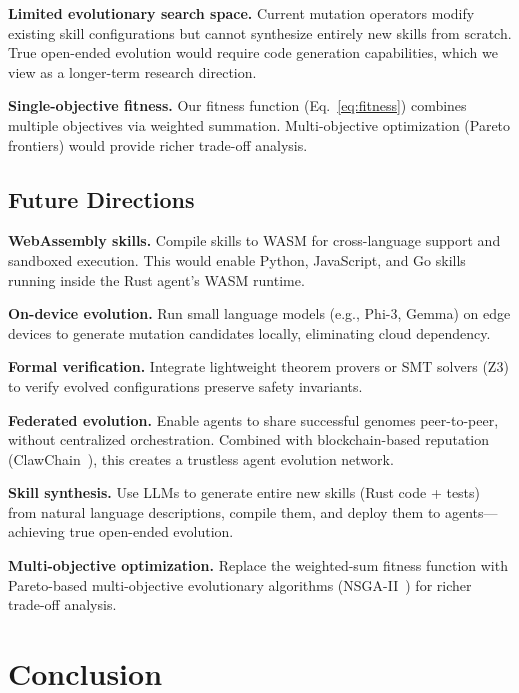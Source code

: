\documentclass{article}
\begin{document}
\textbf{Limited evolutionary search space.} Current mutation operators modify existing skill configurations but cannot synthesize entirely new skills from scratch. True open-ended evolution would require code generation capabilities, which we view as a longer-term research direction.

\textbf{Single-objective fitness.} Our fitness function (Eq.~\ref{eq:fitness}) combines multiple objectives via weighted summation. Multi-objective optimization (Pareto frontiers) would provide richer trade-off analysis.


\subsection{Future Directions}

\textbf{WebAssembly skills.} Compile skills to WASM for cross-language support and sandboxed execution. This would enable Python, JavaScript, and Go skills running inside the Rust agent's WASM runtime.

\textbf{On-device evolution.} Run small language models (e.g., Phi-3, Gemma) on edge devices to generate mutation candidates locally, eliminating cloud dependency.

\textbf{Formal verification.} Integrate lightweight theorem provers or SMT solvers (Z3) to verify evolved configurations preserve safety invariants.

\textbf{Federated evolution.} Enable agents to share successful genomes peer-to-peer, without centralized orchestration. Combined with blockchain-based reputation (ClawChain~\cite{clawchain}), this creates a trustless agent evolution network.

\textbf{Skill synthesis.} Use LLMs to generate entire new skills (Rust code + tests) from natural language descriptions, compile them, and deploy them to agents---achieving true open-ended evolution.

\textbf{Multi-objective optimization.} Replace the weighted-sum fitness function with Pareto-based multi-objective evolutionary algorithms (NSGA-II~\cite{deb2002nsga2}) for richer trade-off analysis.



\section{Conclusion}
\label{sec:conclusion}
\end{document}
